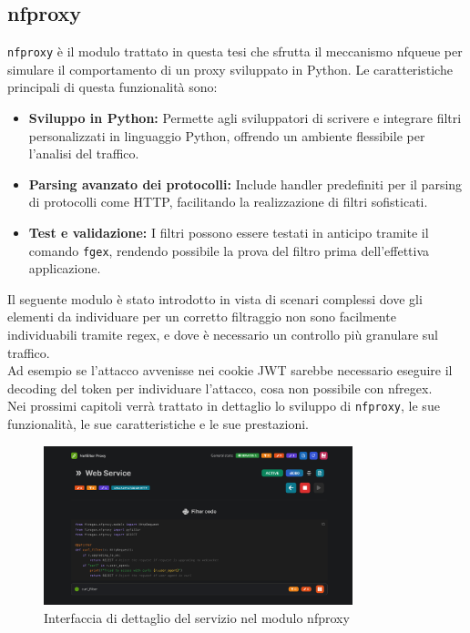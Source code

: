\subsection{nfproxy}
\texttt{nfproxy} è il modulo trattato in questa tesi che sfrutta il meccanismo nfqueue per simulare il comportamento di un proxy sviluppato in Python. Le caratteristiche
principali di questa funzionalità sono:
\begin{itemize}
    \item \textbf{Sviluppo in Python:} Permette agli sviluppatori di scrivere e integrare filtri personalizzati in linguaggio Python, offrendo un ambiente flessibile
    per l'analisi del traffico.
    \item \textbf{Parsing avanzato dei protocolli:} Include handler predefiniti per il parsing di protocolli come HTTP, facilitando la realizzazione di filtri sofisticati.
    \item \textbf{Test e validazione:} I filtri possono essere testati in anticipo tramite il comando \texttt{fgex}, rendendo possibile la prova del filtro prima dell'effettiva applicazione.
\end{itemize}

Il seguente modulo è stato introdotto in vista di scenari complessi dove gli elementi da individuare per un corretto filtraggio non sono facilmente
individuabili tramite regex, e dove è necessario un controllo più granulare sul traffico.\\
Ad esempio se l'attacco avvenisse nei cookie JWT sarebbe necessario eseguire il decoding del token per individuare l'attacco, cosa non possibile con nfregex.\\

Nei prossimi capitoli verrà trattato in dettaglio lo sviluppo di \texttt{nfproxy}, le sue funzionalità, le sue caratteristiche e le sue prestazioni.

\begin{figure}[H]
    \centering
    \includegraphics[width=0.8\textwidth]{images/chapter2/NFProxyInterface.png}
    \caption{Interfaccia di dettaglio del servizio nel modulo nfproxy}
    \label{fig:nfproxy_interface}
\end{figure}

